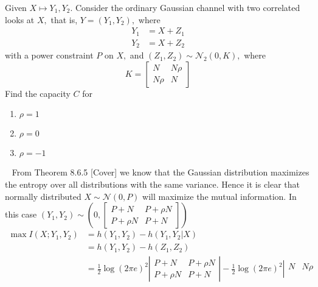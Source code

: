 \begin{exercise}{ Given $X \mapsto Y_1,Y_2$. Consider the ordinary Gaussian channel with two correlated looks at ${X},$ that is, $Y=\left(Y_{1}, Y_{2}\right),$ where
  $$
  \begin{aligned}
  Y_{1} &=X+Z_{1} \\
  Y_{2} &=X+Z_{2}
  \end{aligned}
  $$
  with a power constraint $P$ on $X,$ and $\left(Z_{1}, Z_{2}\right) \sim \mathcal{N}_{2}(0, K),$ where
$$
K=\left[\begin{array}{ll}
N & N \rho \\
N \rho & N
\end{array}\right]
$$
Find the capacity $C$ for
\begin{enumerate}
  \item $\rho=1$
  \item $\rho=0$
  \item $\rho=-1$
\end{enumerate}}
  \begin{solution}
  \par{~}
  From Theorem 8.6.5 [Cover] we know that the Gaussian distribution maximizes the entropy over all distributions with the same variance. Hence it is clear that normally distributed $X \sim \mathcal{N}(0,P)$ will maximize the mutual information. In this case $(Y_1,Y_2) \sim \left(0, \left[\begin{array}{cc}
    P+N & P+\rho N \\
    P +\rho N & P + N
  \end{array}\right]\right)$
  \begin{equation}
    \begin{aligned}
      \max I(X;Y_1,Y_2) &= h(Y_1,Y_2) - h(Y_1,Y_2|X) \\
      &= h(Y_1,Y_2) - h(Z_1,Z_2) \\
      &= \frac{1}{2} \log \left(2\pi e\right)^2 \left|\begin{array}{cc}
        P+N & P+\rho N \\
        P +\rho N & P + N
      \end{array} \right| - \frac{1}{2} \log \left(2\pi e\right)^2 \left| \begin{array}{ll}
        N & N \rho \\

\end{array}
\end{aligned}
\end{equation}
\end{solution}
\end{exercise}
